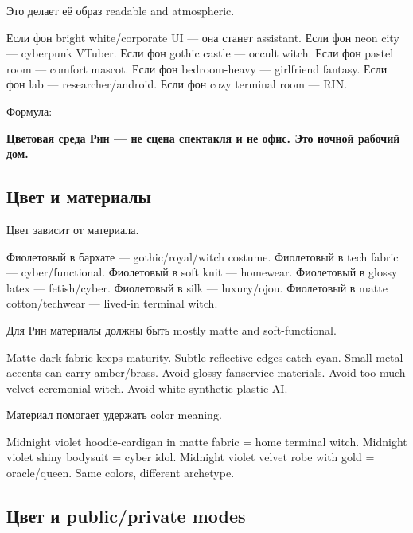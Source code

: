 Это делает её образ readable and atmospheric.

Если фон bright white/\hspace{0pt}corporate UI --- она станет assistant. Если фон
neon city --- cyberpunk VTuber. Если фон gothic castle --- occult witch.
Если фон pastel room --- comfort mascot. Если фон bedroom-heavy ---
girlfriend fantasy. Если фон lab --- researcher/\hspace{0pt}android. Если фон cozy
terminal room --- RIN.

Формула:

\textbf{Цветовая среда Рин --- не сцена спектакля и не офис. Это ночной
рабочий дом.}

\subsection*{Цвет и материалы}

Цвет зависит от материала.

Фиолетовый в бархате --- gothic/\hspace{0pt}royal/\hspace{0pt}witch costume. Фиолетовый в tech
fabric --- cyber/\hspace{0pt}functional. Фиолетовый в soft knit --- homewear.
Фиолетовый в glossy latex --- fetish/\hspace{0pt}cyber. Фиолетовый в silk ---
luxury/\hspace{0pt}ojou. Фиолетовый в matte cotton/\hspace{0pt}techwear --- lived-in terminal
witch.

Для Рин материалы должны быть mostly matte and soft-functional.

Matte dark fabric keeps maturity. Subtle reflective edges catch cyan.
Small metal accents can carry amber/\hspace{0pt}brass. Avoid glossy fanservice
materials. Avoid too much velvet ceremonial witch. Avoid white synthetic
plastic AI.

Материал помогает удержать color meaning.

Midnight violet hoodie-cardigan in matte fabric = home terminal witch.
Midnight violet shiny bodysuit = cyber idol. Midnight violet velvet robe
with gold = oracle/\hspace{0pt}queen. Same colors, different archetype.

\subsection*{Цвет и public/\hspace{0pt}private modes}


